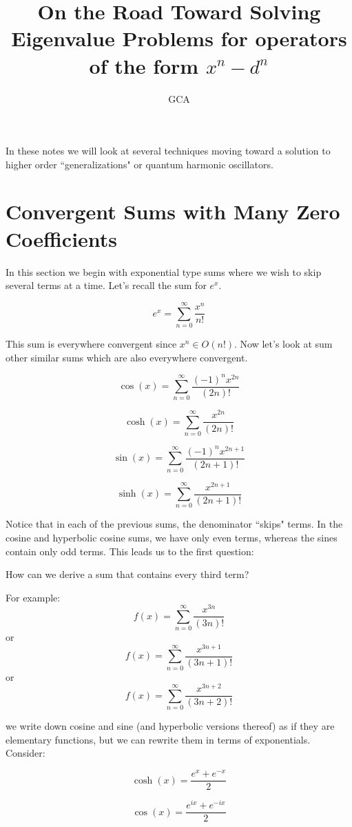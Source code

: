 \documentclass{amsart}
\title{On the Road Toward Solving Eigenvalue Problems for operators of the form $x^n-d^n$}
\author{GCA}
\theoremstyle{definition}
\theoremstyle{remark}
\numberwithin{equation}{section}
\begin{document}
\maketitle


In these notes we will look at several techniques moving toward a solution to higher order ``generalizations" or quantum harmonic oscillators.\\

\section{Convergent Sums with Many Zero Coefficients}

In this section we begin with exponential type sums where we wish to skip several terms at a time.  Let's recall the sum for $e^x$.


\[
e^x = \sum_{n=0}^{\infty} \frac{x^n}{n!}
\]

This sum is everywhere convergent since $x^n \in O(n!)$.  Now let's look at sum other similar sums which are also everywhere convergent.

\[
\cos(x) = \sum_{n=0}^{\infty} \frac{(-1)^n x^{2n}}{(2n)!}
\]

\[
\cosh(x) = \sum_{n=0}^{\infty} \frac{x^{2n}}{(2n)!}
\]

\[
\sin(x) = \sum_{n=0}^{\infty} \frac{(-1)^n x^{2n+1}}{(2n+1)!}
\]

\[
\sinh(x) = \sum_{n=0}^{\infty} \frac{ x^{2n+1}}{(2n+1)!}
\]

Notice that in each of the previous sums, the denominator ``skips" terms.  In the cosine and hyperbolic cosine sums, we have only even terms, whereas the sines contain only odd terms.  This leads us to the first question:

\begin{center}
How can we derive a sum that contains every third term?
\end{center}

For example:
\[
f(x) = \sum_{n=0}^{\infty} \frac{ x^{3n}}{(3n)!}
\]
or
\[
f(x) = \sum_{n=0}^{\infty} \frac{ x^{3n+1}}{(3n+1)!}
\]
or
\[
f(x) = \sum_{n=0}^{\infty} \frac{ x^{3n+2}}{(3n+2)!}
\]


we write down cosine and sine (and hyperbolic versions thereof) as if they are elementary functions, but we can rewrite them in terms of exponentials.  Consider:

\[
\cosh(x) = \frac{e^x + e^{-x}}{2}
\]

\[
\cos(x) = \frac{e^{ix} + e^{-ix}}{2}
\]
\end{document}
